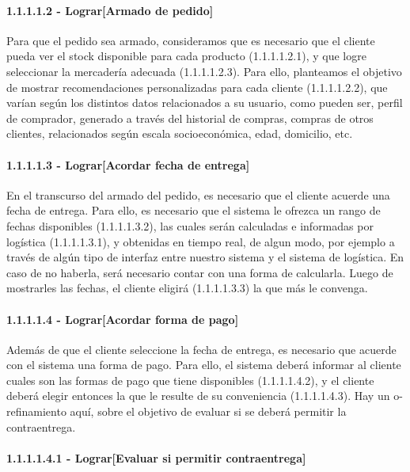 \paragraph{1.1.1.1.2 - Lograr[Armado de pedido]}

Para que el pedido sea armado, consideramos que es necesario que el cliente
pueda ver el stock disponible para cada producto (1.1.1.1.2.1), y que logre
seleccionar la mercadería adecuada (1.1.1.1.2.3). Para ello, planteamos el
objetivo de mostrar recomendaciones personalizadas para cada cliente
(1.1.1.1.2.2), que varían según los distintos datos relacionados a su usuario,
como pueden ser, perfil de comprador, generado a través del historial de
compras, compras de otros clientes, relacionados según escala socioeconómica,
edad, domicilio, etc.

\paragraph{1.1.1.1.3 - Lograr[Acordar fecha de entrega]}

En el transcurso del armado del pedido, es necesario que el cliente acuerde una
fecha de entrega. Para ello, es necesario que el sistema le ofrezca un rango de
fechas disponibles (1.1.1.1.3.2), las cuales serán calculadas e informadas por
logística (1.1.1.1.3.1), y obtenidas en tiempo real, de algun modo, por ejemplo
a través de algún tipo de interfaz entre nuestro sistema y el sistema de
logística. En caso de no haberla, será necesario contar con una forma de
calcularla. Luego de mostrarles las fechas, el cliente eligirá (1.1.1.1.3.3) la
que más le convenga.

\paragraph{1.1.1.1.4 - Lograr[Acordar forma de pago]}

Además de que el cliente seleccione la fecha de entrega, es necesario que
acuerde con el sistema una forma de pago. Para ello, el sistema deberá informar
al cliente cuales son las formas de pago que tiene disponibles (1.1.1.1.4.2), y
el cliente deberá elegir entonces la que le resulte de su conveniencia
(1.1.1.1.4.3). Hay un o-refinamiento aquí, sobre el objetivo de evaluar si se
deberá permitir la contraentrega.

\paragraph{1.1.1.1.4.1 - Lograr[Evaluar si permitir contraentrega]}

